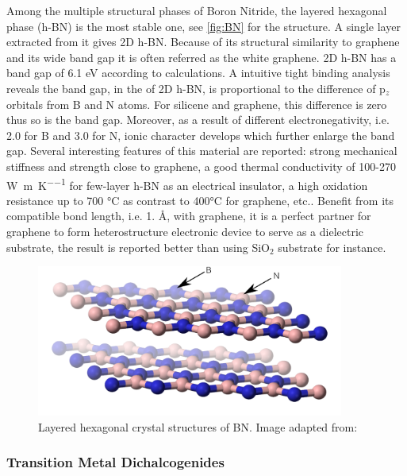 Among the multiple structural phases of Boron Nitride, the layered hexagonal phase (h-BN) is the most stable one, see \autoref{fig:BN} for the structure. A single layer extracted from it gives 2D h-BN. Because of its structural similarity to graphene and its wide band gap it is often referred as the white graphene\cite{alem2009atomically}. 2D h-BN has a band gap of 6.1 eV according to calculations. A intuitive tight binding analysis reveals the band gap, in the of 2D h-BN, is proportional to the difference of p$_z$ orbitals from B and N atoms. For silicene and graphene, this difference is zero thus so is the band gap. Moreover, as a result of different electronegativity, i.e. 2.0 for B and 3.0 for N, ionic character develops which further enlarge the band gap\cite{zhuang2012}. Several interesting features of this material are reported: strong mechanical stiffness and strength close to graphene\cite{Bosak2006}, a good thermal conductivity of 100-270 \si{\watt\per\meter\per\kelvin} for few-layer h-BN\cite{Jo2013} as an electrical insulator, a high oxidation resistance up to 700 \si{\celsius} as contrast to 400\si{\celsius} for graphene\cite{li2016atomically}, etc.. Benefit from its compatible bond length, i.e. 1. \AA, with graphene, it is a perfect partner for graphene to form heterostructure electronic device to serve as a dielectric substrate\cite{Lee2013}, the result is reported better than using SiO$_2$ substrate\cite{dean2010boron} for instance. 


\begin{figure}[htbp!] 
\centering  
\includegraphics[width=0.9\textwidth]{BN.png}
\caption{Layered hexagonal crystal structures of BN. Image adapted from:\cite{Benjah2007}}  
\label{fig:BN}
\end{figure} 


\subsubsection{Transition Metal Dichalcogenides}

